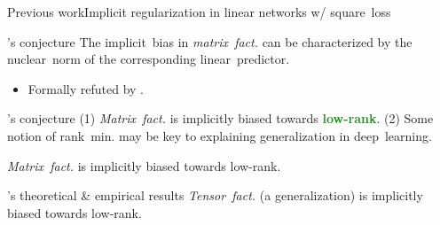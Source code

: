 \documentclass[handout,usenames,dvipsnames]{beamer} %
\newcommand{\true}[1]{{\textcolor{ForestGreen}{\textbf{#1}}}}
\begin{document}
\begin{frame}{Previous work}{Implicit regularization in linear networks w/ square~loss}
    \pause
    \begin{block}{\cite{gunasekar2018implicit}’s conjecture }
        The implicit~bias in \emph{matrix~fact.} can be characterized by the \alert{nuclear~norm} of the corresponding linear~predictor.
    \end{block}
    \pause
    \begin{itemize}
        \item \alert{Formally refuted} by \cite{li2020towards}.
    \end{itemize}
    \pause
    \begin{block}{\cite{razin2020implicit}’s conjecture}
        (1) \emph{Matrix~fact.} is implicitly biased towards \true{low-rank}. (2) Some notion of rank~min. may be key to explaining generalization in deep~learning.
    \end{block}
    \pause
    \begin{exampleblock}{\cite{li2020towards} \hfill\checkmark}
        \emph{Matrix~fact.} is implicitly biased towards low-rank.
    \end{exampleblock}
    \pause
    \begin{exampleblock}{\cite{razin2021implicit}’s theoretical \& empirical results \hfill\checkmark}
        \emph{Tensor~fact.} (a generalization) is implicitly biased towards low-rank.
    \end{exampleblock}
    

\end{frame}
\end{document}
